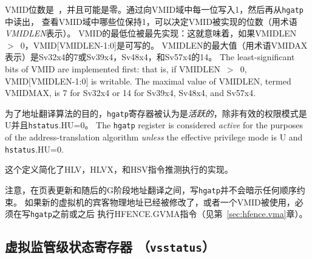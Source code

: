 VMID位数是\unspecified\ ，并且可能是零。通过向VMID域中每一位写入1，然后再从{\tt hgatp}中读出，
查看VMID域中哪些位保持1，可以决定VMID被实现的位数（用术语{\mbox {\em VMIDLEN}}表示）。
VMID的最低位被最先实现：这就意味着，如果VMIDLEN~$>$~0，VMID[VMIDLEN-1:0]是可写的。
VMIDLEN的最大值（用术语VMIDAX表示）是Sv32x4的7或Sv39x4，Sv48x4，和Sv57x4的14。
The least-significant bits of VMID are implemented first:
that is, if VMIDLEN~$>$~0, VMID[VMIDLEN-1:0] is writable.
The maximal value of VMIDLEN, termed VMIDMAX, is 7 for Sv32x4 or 14 for Sv39x4,
Sv48x4, and Sv57x4.

为了地址翻译算法的目的，{\tt hgatp}寄存器被认为是{\em 活跃的}，除非有效的权限模式是U并且{\tt hstatus}.HU=0。
The {\tt hgatp} register is considered {\em active} for the purposes of the
address-translation algorithm {\em unless} the effective privilege mode is U
and {\tt hstatus}.HU=0.

\begin{commentary}
  这个定义简化了HLV，HLVX，和HSV指令推测执行的实现。
\end{commentary}

注意，在页表更新和随后的G阶段地址翻译之间，写{\tt hgatp}并不会暗示任何顺序约束。
如果新的虚拟机的宾客物理地址已经被修改了，或者一个VMID被使用，必须在写{\tt hgatp}之前或之后
执行HFENCE.GVMA指令（见第~\ref{sec:hfence.vma}章）。


\subsection{虚拟监管级状态寄存器 （{\tt vsstatus}）}


